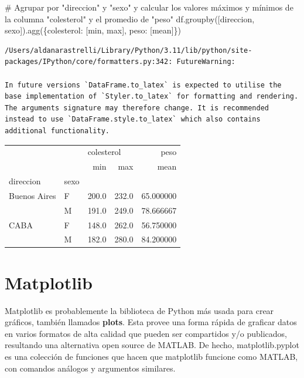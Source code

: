\documentclass[
  letterpaper,
  DIV=11,
  numbers=noendperiod]{scrreprt}
\newenvironment{Shaded}{\begin{snugshade}}{\end{snugshade}}
\newcommand{\CommentTok}[1]{\textcolor[rgb]{0.37,0.37,0.37}{#1}}
\newcommand{\NormalTok}[1]{\textcolor[rgb]{0.00,0.23,0.31}{#1}}
\newcommand{\StringTok}[1]{\textcolor[rgb]{0.13,0.47,0.30}{#1}}
\begin{document}
\begin{Shaded}
\begin{Highlighting}[]
\CommentTok{\# Agrupar por "direccion" y "sexo" y calcular los valores máximos y mínimos de la columna "colesterol" y el promedio de "peso"}
\NormalTok{df.groupby([}\StringTok{\textquotesingle{}direccion\textquotesingle{}}\NormalTok{, }\StringTok{\textquotesingle{}sexo\textquotesingle{}}\NormalTok{]).agg(\{}\StringTok{\textquotesingle{}colesterol\textquotesingle{}}\NormalTok{: [}\StringTok{\textquotesingle{}min\textquotesingle{}}\NormalTok{, }\StringTok{\textquotesingle{}max\textquotesingle{}}\NormalTok{], }\StringTok{\textquotesingle{}peso\textquotesingle{}}\NormalTok{: [}\StringTok{\textquotesingle{}mean\textquotesingle{}}\NormalTok{]\})}
\end{Highlighting}
\end{Shaded}

\begin{verbatim}
/Users/aldanarastrelli/Library/Python/3.11/lib/python/site-packages/IPython/core/formatters.py:342: FutureWarning:

In future versions `DataFrame.to_latex` is expected to utilise the base implementation of `Styler.to_latex` for formatting and rendering. The arguments signature may therefore change. It is recommended instead to use `DataFrame.style.to_latex` which also contains additional functionality.
\end{verbatim}

\begin{tabular}{llrrr}
\toprule
     &   & \multicolumn{2}{l}{colesterol} &       peso \\
     &   &        min &    max &       mean \\
direccion & sexo &            &        &            \\
\midrule
Buenos Aires & F &      200.0 &  232.0 &  65.000000 \\
     & M &      191.0 &  249.0 &  78.666667 \\
CABA & F &      148.0 &  262.0 &  56.750000 \\
     & M &      182.0 &  280.0 &  84.200000 \\
\bottomrule
\end{tabular}

\section{Matplotlib}\label{matplotlib}

Matplotlib es probablemente la biblioteca de Python más usada para crear
gráficos, también llamados \textbf{plots}. Esta provee una forma rápida
de graficar datos en varios formatos de alta calidad que pueden ser
compartidos y/o publicados, resultando una alternativa open source de
MATLAB. De hecho, matplotlib.pyplot es una colección de funciones que
hacen que matplotlib funcione como MATLAB, con comandos análogos y
argumentos similares.
\end{document}
